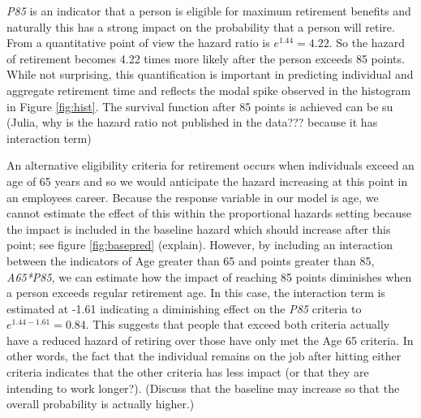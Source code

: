\documentclass[12pt,letterpaper]{article}
\begin{document}
{\it P85} is an indicator that a person is eligible for maximum retirement benefits and naturally this has a strong impact on the probability that a person will retire.  From a quantitative point of view the hazard ratio is $e^{1.44} = 4.22$.  So the hazard of retirement becomes 4.22 times more likely after the person exceeds 85 points.  While not surprising, this quantification is important in predicting individual and aggregate retirement time and reflects the modal spike observed in the histogram in Figure \ref{fig:hist}.  The survival function after 85 points is achieved can be su
(Julia, why is the hazard ratio not published in the data??? because it has interaction term)

An alternative eligibility criteria for retirement occurs when individuals exceed an age of 65 years and so we would anticipate the hazard increasing at this point in an employees career.  Because the response variable in our model is age, we cannot estimate the effect of this within the proportional hazards setting because the impact is included in the baseline hazard which should increase after this point; see figure \ref{fig:basepred} (explain).  However, by including an interaction between the indicators of Age greater than 65 and points greater than 85, {\it A65*P85}, we can estimate how the impact of reaching 85 points diminishes when a person exceeds regular retirement age.  In this case, the interaction term is estimated at -1.61 indicating a diminishing effect on the {\it P85} criteria to $e^{1.44-1.61} =0.84$.  This suggests that people that exceed both criteria actually have a reduced hazard of retiring over those have only met the Age 65 criteria.  In other words, the fact that the individual remains on the job after hitting either criteria indicates that the other criteria has less impact (or that they are intending to work longer?).  (Discuss that the baseline may increase so that the overall probability is actually higher.)
\end{document}

